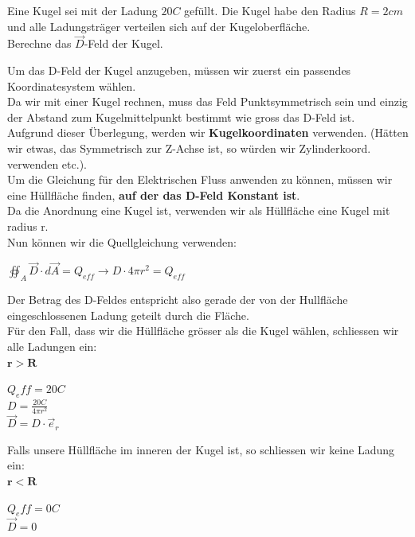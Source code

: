 					\iend

					\beginbsp
					Eine Kugel sei mit der Ladung $20 C$ gefüllt. Die Kugel habe den Radius $R = 2cm$ und alle Ladungsträger verteilen sich auf der Kugeloberfläche. \\
					Berechne das $\vec{D}$-Feld der Kugel.
					\iend

					\beginbsp
					Um das D-Feld der Kugel anzugeben, müssen wir zuerst ein passendes Koordinatesystem wählen. \\
					Da wir mit einer Kugel rechnen, muss das Feld Punktsymmetrisch sein und einzig der Abstand zum Kugelmittelpunkt bestimmt wie gross das D-Feld ist. \\
					Aufgrund dieser Überlegung, werden wir \textbf{Kugelkoordinaten} verwenden. (Hätten wir etwas, das Symmetrisch zur Z-Achse ist, so würden wir Zylinderkoord. verwenden etc.). \\
					Um die Gleichung für den Elektrischen Fluss anwenden zu können, müssen wir eine Hüllfläche finden,   \textbf{auf der das D-Feld Konstant ist}. \\
					Da die Anordnung eine Kugel ist, verwenden wir als Hüllfläche eine Kugel mit radius r. \\
					Nun können wir die Quellgleichung verwenden:
					\begin{center}
						$ \oiint_A \vec{D}\cdot d\vec{A} = Q_{eff} \rightarrow D \cdot  4\pi r^2  = Q_{eff} $
					\end{center}
					Der Betrag des D-Feldes entspricht also gerade der von der Hullfläche eingeschlossenen Ladung geteilt durch die Fläche. \\
					Für den Fall, dass wir die Hüllfläche grösser als die Kugel wählen, schliessen wir alle Ladungen ein: \\
					$\mathbf{r > R}$ \\
					\begin{center}
						$Q_eff = 20C$ \\
						$D = \frac{20C}{4\pi r^2}$ \\
						$\vec{D} = D \cdot \vec{e}_r$
					\end{center}

					Falls unsere Hüllfläche im inneren der Kugel ist, so schliessen wir keine Ladung ein: \\
					$\mathbf{r < R}$ \\
					\begin{center}
						$Q_eff = 0C$ \\
						$\vec{D} = 0$
					\end{center}

